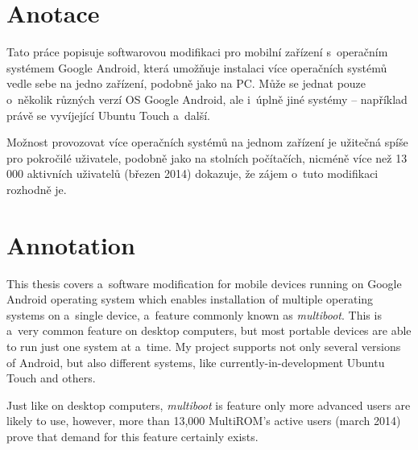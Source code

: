 \documentclass[12pt, a4paper, oneside]{article}
\newcommand{\It}{\textit}  %
\begin{document}
\section*{Anotace}
Tato práce popisuje softwarovou modifikaci pro mobilní zařízení s~operačním systémem Google Android, která umožňuje instalaci více operačních systémů vedle sebe na jedno zařízení, podobně jako na PC. Může se jednat pouze o~několik různých verzí OS Google Android, ale i~úplně jiné systémy -- například právě se vyvíjející Ubuntu Touch a~další.

Možnost provozovat více operačních systémů na jednom zařízení je užitečná spíše pro pokročilé uživatele, podobně jako na stolních počítačích, nicméně více než 13 000 aktivních uživatelů (březen 2014) dokazuje, že zájem o~tuto modifikaci rozhodně je.

\section*{Annotation}
This thesis covers a~software modification for mobile devices running on Google Android operating system which enables installation of multiple operating systems on a~single device, a~feature commonly known as \It{multiboot}. This is a~very common feature on desktop computers, but most portable devices are able to run just one system at a~time. My project supports not only several versions of Android, but also different systems, like currently-in-development Ubuntu Touch and others.

Just like on desktop computers, \It{multiboot} is feature only more advanced users are likely to use, however, more than 13,000 MultiROM's active users (march 2014) prove that demand for this feature certainly exists.

\addtolength{\textheight}{30mm} %

\newpage
\pagestyle{plain}

\setlength{\voffset}{-20mm} %
\setcounter{page}{1}  %

\tableofcontents  %

\addtolength{\textheight}{-30mm} %
\newpage
\setlength{\voffset}{0mm} %
\pagestyle{plain}
\end{document}
